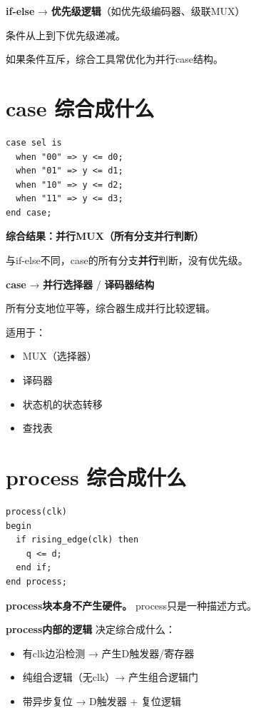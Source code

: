\begin{keypoint}[if-else与硬件]
\textbf{if-else} → \textbf{优先级逻辑}（如优先级编码器、级联MUX）

条件从上到下优先级递减。

如果条件互斥，综合工具常优化为并行case结构。
\end{keypoint}

\section{case 综合成什么}

\begin{lstlisting}
case sel is
  when "00" => y <= d0;
  when "01" => y <= d1;
  when "10" => y <= d2;
  when "11" => y <= d3;
end case;
\end{lstlisting}

\textbf{综合结果：并行MUX（所有分支并行判断）}

与if-else不同，case的所有分支\textbf{并行}判断，没有优先级。

\begin{keypoint}[case与硬件]
\textbf{case} → \textbf{并行选择器} / \textbf{译码器结构}

所有分支地位平等，综合器生成并行比较逻辑。

适用于：
\begin{itemize}
  \item MUX（选择器）
  \item 译码器
  \item 状态机的状态转移
  \item 查找表
\end{itemize}
\end{keypoint}

\section{process 综合成什么}

\begin{lstlisting}
process(clk)
begin
  if rising_edge(clk) then
    q <= d;
  end if;
end process;
\end{lstlisting}

\textbf{process块本身不产生硬件。} process只是一种描述方式。

\textbf{process内部的逻辑} 决定综合成什么：
\begin{itemize}
  \item 有clk边沿检测 → 产生D触发器/寄存器
  \item 纯组合逻辑（无clk）→ 产生组合逻辑门
  \item 带异步复位 → D触发器 + 复位逻辑
\end{itemize}

